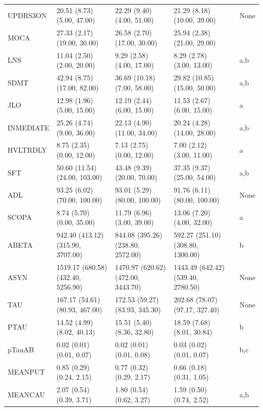 \documentclass[1pt]{article}
\begin{document}
\begin{landscape}
\begin{tabular}{llllll}
	UPDRS3ON &         20.51 (8.73) (5.00, 47.00) &         22.29 (9.40) (4.00, 51.00) &        21.29 (8.18) (10.00, 39.00) &         &     None \\
	MOCA &        27.33 (2.17) (19.00, 30.00) &        26.58 (2.70) (17.00, 30.00) &        25.94 (2.38) (21.00, 29.00) &         &          \\
	LNS &         11.04 (2.50) (2.00, 20.00) &          9.29 (2.58) (4.00, 17.00) &          8.29 (2.78) (3.00, 13.00) &         &      a,b \\
	SDMT &        42.94 (8.75) (17.00, 82.00) &        36.69 (10.18) (7.00, 58.00) &       29.82 (10.85) (15.00, 50.00) &         &      a,b \\
	JLO &         12.98 (1.96) (5.00, 15.00) &         12.19 (2.44) (6.00, 15.00) &         11.53 (2.67) (6.00, 15.00) &         &        a \\
	INMEDIATE &         25.26 (4.74) (9.00, 36.00) &        22.13 (4.90) (11.00, 34.00) &        20.24 (4.28) (14.00, 28.00) &         &      a,b \\
	HVLTRDLY &          8.75 (2.35) (0.00, 12.00) &          7.13 (2.75) (0.00, 12.00) &          7.00 (2.12) (3.00, 11.00) &         &        a \\
	SFT &      50.60 (11.54) (24.00, 103.00) &        43.48 (9.39) (20.00, 70.00) &        37.35 (9.37) (25.00, 54.00) &         &      a,b \\
	ADL &       93.25 (6.02) (70.00, 100.00) &       93.01 (5.29) (80.00, 100.00) &       91.76 (6.11) (80.00, 100.00) &         &     None \\
	SCOPA &          8.74 (5.70) (0.00, 35.00) &         11.79 (6.96) (3.00, 39.00) &         13.06 (7.20) (4.00, 32.00) &         &        a \\
	ABETA &  942.40 (413.12) (315.90, 3707.00) &  844.08 (395.26) (238.80, 2572.00) &  592.27 (251.10) (308.80, 1300.00) &         &        b \\
	ASYN & 1519.17 (680.58) (432.40, 5256.90) & 1470.97 (620.62) (472.00, 3443.70) & 1443.49 (642.42) (539.40, 2780.50) &         &     None \\
	TAU &     167.17 (54.61) (80.93, 467.00) &     172.53 (59.27) (83.93, 345.30) &     202.68 (78.07) (97.17, 327.40) &         &     None \\
	PTAU &         14.52 (4.99) (8.02, 40.13) &         15.51 (5.40) (8.36, 32.80) &         18.59 (7.68) (8.01, 30.84) &         &        b \\
	pTauAB &           0.02 (0.01) (0.01, 0.07) &           0.02 (0.01) (0.01, 0.08) &           0.03 (0.02) (0.01, 0.07) &         &      b,c \\
	MEANPUT &           0.85 (0.29) (0.24, 2.15) &           0.77 (0.32) (0.29, 2.17) &           0.66 (0.18) (0.31, 1.05) &         &          \\
	MEANCAU &           2.07 (0.54) (0.39, 3.71) &           1.80 (0.54) (0.62, 3.27) &           1.59 (0.50) (0.74, 2.52) &         &      a,b \\
	\bottomrule
\end{tabular}





\end{landscape}
\end{document}
